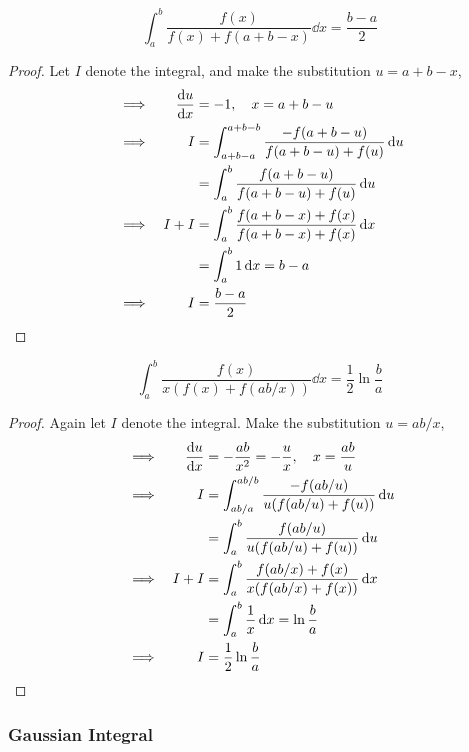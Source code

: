 \begin{theorem}
\begin{equation*}
\int_a^b \frac{f(x)}{f(x) + f(a + b - x)} \dd{x} = \frac{b - a} 2
\end{equation*}
\end{theorem}
\begin{proof}
Let \(I\) denote the integral, and make the substitution \(u = a + b - x\),
\begin{alignat*}{2}
&\implies& \dv{u}{x} &= -1, \quad x = a + b - u \\
&\implies& I &= \int_{a + b - a}^{a + b - b}
                    \frac{-f(a + b - u)}{f(a + b - u) + f(u)} \dd{u} \\
&&  &= \int_a^b \frac{f(a + b - u)}{f(a + b - u) + f(u)} \dd{u} \\
&\implies& I + I &= \int_a^b
                    \frac{f(a + b - x) + f(x)}
                         {f(a + b - x) + f(x)} \dd{x} \\
&&  &= \int_a^b 1 \dd{x} = b - a \\
&\implies& I &= \frac{b - a} 2 \tag*{\qedhere}
\end{alignat*}
\end{proof}
\begin{theorem}
\begin{equation*}
\int_a^b \frac{f(x)}{x(f(x) + f(ab / x))} \dd{x} = \frac 12 \ln \frac ba
\end{equation*}
\end{theorem}
\begin{proof}
Again let \(I\) denote the integral. Make the substitution \(u = ab / x\),
\begin{alignat*}{2}
&\implies& \dv{u}{x} &= -\frac{ab}{x^2} = -\frac ux, \quad x = \frac{ab}u \\
&\implies& I &= \int_{ab/a}^{ab/b} \frac{-f(ab / u)}{u(f(ab / u) + f(u))}
    \dd{u} \\
&& &= \int_a^b \frac{f(ab / u)}{u(f(ab / u) + f(u))} \dd{u} \\
&\implies& I + I &= \int_a^b \frac{f(ab / x) + f(x)}
                                  {x(f(ab / x) + f(x))} \dd{x} \\
&& &= \int_a^b \frac 1x \dd{x} = \ln \frac ba \\
&\implies& I &= \frac 12 \ln \frac ba \tag*{\qedhere}
\end{alignat*}
\end{proof}

\subsubsection{Gaussian Integral}

